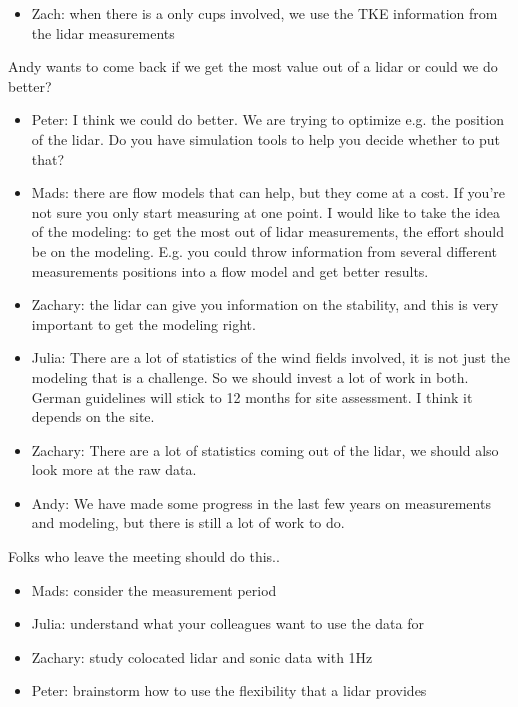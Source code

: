 \begin{itemize}
\item  Zach: when there is a only cups involved, we use the TKE information
  from the lidar measurements
\end{itemize}

Andy wants to come back if we get the most value out of a lidar or could
we do better?

\begin{itemize}
\item  Peter: I think we could do better. We are trying to optimize e.g. the
  position of the lidar. Do you have simulation tools to help you decide
  whether to put that?
\item  Mads: there are flow models that can help, but they come at a cost. If
  you're not sure you only start measuring at one point. I would like to
  take the idea of the modeling: to get the most out of lidar
  measurements, the effort should be on the modeling. E.g. you could
  throw information from several different measurements positions into a
  flow model and get better results.
\item  Zachary: the lidar can give you information on the stability, and this
  is very important to get the modeling right.
\item  Julia: There are a lot of statistics of the wind fields involved, it
  is not just the modeling that is a challenge. So we should invest a
  lot of work in both. German guidelines will stick to 12 months for
  site assessment. I think it depends on the site.
\item  Zachary: There are a lot of statistics coming out of the lidar, we
  should also look more at the raw data.
\item  Andy: We have made some progress in the last few years on measurements
  and modeling, but there is still a lot of work to do.
\end{itemize}

Folks who leave the meeting should do this..

\begin{itemize}
\item  Mads: consider the measurement period
\item  Julia: understand what your colleagues want to use the data for
\item  Zachary: study colocated lidar and sonic data with 1Hz
\item  Peter: brainstorm how to use the flexibility that a lidar provides
\end{itemize}